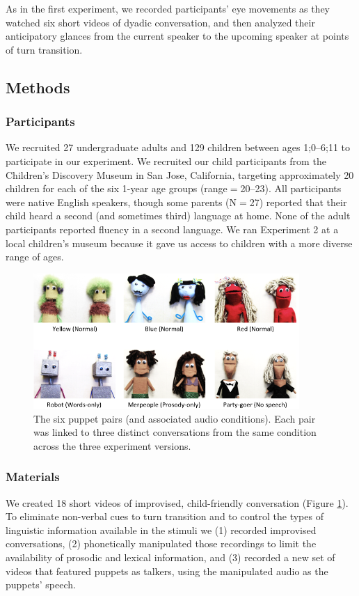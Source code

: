 \documentclass[authoryear, 12pt]{elsarticle}
\begin{document}
As in the first experiment, we recorded participants' eye movements as they watched six short videos of dyadic conversation, and then analyzed their anticipatory glances from the current speaker to the upcoming speaker at points of turn transition.

\subsection{Methods}
\label{sec:methods2}

\subsubsection{Participants}
We recruited 27 undergraduate adults and 129 children between ages 1;0--6;11 to participate in our experiment. We recruited our child participants from the Children's Discovery Museum in San Jose, California, targeting approximately 20 children for each of the six 1-year age groups (range$=$20--23). All participants were native English speakers, though some parents (N$=$27) reported that their child heard a second (and sometimes third) language at home. None of the adult participants reported fluency in a second language. We ran Experiment 2 at a local children's museum because it gave us access to children with a more diverse range of ages.

\begin{figure}[t]
\begin{center}
\includegraphics[width=0.9\textwidth]{figures/FIG-EN-stim.png}
\end{center}
\caption{The six puppet pairs (and associated audio conditions). Each pair was linked to three distinct conversations from the same condition across the three experiment versions.}
\label{fig:puppets}
\end{figure}

\subsubsection{Materials}
We created 18 short videos of improvised, child-friendly conversation (Figure \ref{fig:puppets}). To eliminate non-verbal cues to turn transition and to control the types of linguistic information available in the stimuli we (1) recorded improvised conversations, (2) phonetically manipulated those recordings to limit the availability of prosodic and lexical information, and (3) recorded a new set of videos that featured puppets as talkers, using the manipulated audio as the puppets' speech. 
\end{document}
